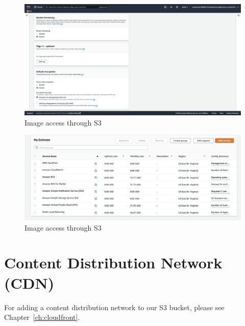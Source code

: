 \begin{figure}
    \centering
    \includegraphics[width=\textwidth]{resources/s3/s3-versioning-encrypting.png}
    \caption{Image access through S3}
    \label{fig:s3-versioning-encrypting}
\end{figure}

\begin{figure}
    \centering
    \includegraphics[width=\textwidth]{resources/s3/Screenshot 2022-05-14 at 6.45.18 pm.png}
    \caption{Image access through S3}
    \label{fig:s3-unknown-screenshot}
\end{figure}

\section{Content Distribution Network (CDN)}
For adding a content distribution network to our S3 bucket, please see Chapter~\ref{ch:cloudfront}.

